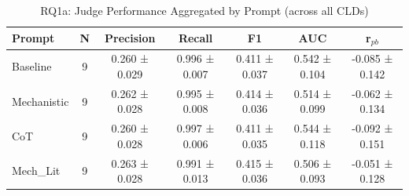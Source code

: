 \begin{table}[htbp]
\centreing
\caption{RQ1a: Judge Performance Aggregated by Prompt (across all CLDs)}
\label{tab:rq1a_by_prompt}
\begin{tabular}{lcccccc}
\toprule
\textbf{Prompt} & \textbf{N} & \textbf{Precision} & \textbf{Recall} & \textbf{F1} & \textbf{AUC} & \textbf{r$_{pb}$} \\
\midrule
Baseline & 9 & 0.260 ± 0.029 & 0.996 ± 0.007 & 0.411 ± 0.037 & 0.542 ± 0.104 & -0.085 ± 0.142 \\
Mechanistic & 9 & 0.262 ± 0.028 & 0.995 ± 0.008 & 0.414 ± 0.036 & 0.514 ± 0.099 & -0.062 ± 0.134 \\
CoT & 9 & 0.260 ± 0.028 & 0.997 ± 0.006 & 0.411 ± 0.035 & 0.544 ± 0.118 & -0.092 ± 0.151 \\
Mech_Lit & 9 & 0.263 ± 0.028 & 0.991 ± 0.013 & 0.415 ± 0.036 & 0.506 ± 0.093 & -0.051 ± 0.128 \\
\bottomrule
\end{tabular}
\end{table}